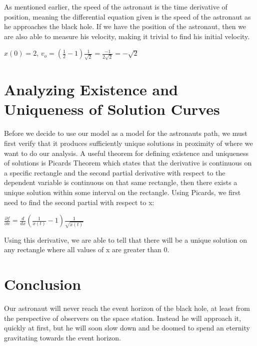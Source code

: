 \documentclass[11pt,english]{article}
\begin{document}
As mentioned earlier, the speed of the astronaut is the time derivative of position, meaning the differential equation given is the speed of the astronaut as he approaches the black hole. If we have the position of the astronaut, then we are also able to measure his velocity, making it trivial to find his initial velocity.

\begin{center}
$x(0) = 2$,  $v_o = (\frac{1}{2} - 1)\frac{1}{\sqrt{2}} = \frac{-1}{2\sqrt{2}} = -\sqrt{2}$
\end{center}

\section*{Analyzing Existence and Uniqueness of Solution Curves}

Before we decide to use our model as a model for the astronaut\textquotesingle s path, we must first verify that it produces sufficiently unique solutions in proximity of where we want to do our analysis. A useful theorem for defining existence and uniqueness of solutions is Picard\textquotesingle s Theorem which states that the derivative is continuous on a specific rectangle and the second partial derivative with respect to the dependent variable is continuous on that same rectangle, then there exists a unique solution within some interval on the rectangle. Using Picard\textquotesingle s, we first need to find the second partial with respect to x:

\begin{center}
  $\frac{\partial f}{\partial x} = \frac{d}{dx} (\frac{1}{x(t)} - 1) \frac{1}{\sqrt{x(t)}}$
\end{center}

Using this derivative, we are able to tell that there will be a unique solution on any rectangle where all values of x are greater than 0. 

\section*{Conclusion}

Our astronaut will never reach the event horizon of the black hole, at least from the perspective of observers on the space station. Instead he will approach it, quickly at first, but he will soon slow down and be doomed to spend an eternity gravitating towards the event horizon. 

\end{document}
